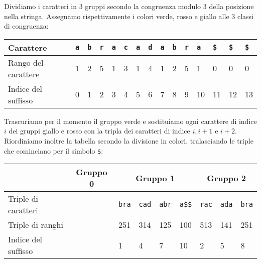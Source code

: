 Dividiamo i caratteri in \(3\) gruppi secondo la congruenza modulo \(3\) della 
posizione nella stringa. Assegnamo rispettivamente i colori verde, rosso e giallo 
alle \(3\) classi di congruenza:
\begin{table}[H]
  \begin{tabularx}{\linewidth}{l*{14}{X}}
    Carattere              & \texttt{a} & \texttt{b} & \texttt{r} & \texttt{a}
                           & \texttt{c} & \texttt{a} & \texttt{d} & \texttt{a}
                           & \texttt{b} & \texttt{r} & \texttt{a} & \texttt{\$}
                           & \texttt{\$} & \texttt{\$} \\
    \hline
    Rango del carattere    & 1 & 2 & 5 & 1 & 3 & 1 & 4 & 1 & 2 & 5 & 1 & 0 & 0 & 0 \\
    Indice del suffisso    & 0 \cellcolor{green} & 1 \cellcolor{red} & 2 \cellcolor{yellow} 
                           & 3 \cellcolor{green} & 4 \cellcolor{red} & 5 \cellcolor{yellow} 
                           & 6 \cellcolor{green} & 7 \cellcolor{red} & 8 \cellcolor{yellow} 
                           & 9 \cellcolor{green} & 10 \cellcolor{red} & 11 \cellcolor{yellow} 
                           & 12 \cellcolor{green} & 13 \cellcolor{red} \\
  \end{tabularx}
\end{table}

Trascuriamo per il momento il gruppo verde e sostituiamo ogni carattere di indice 
\(i\) dei gruppi giallo e rosso con la tripla dei caratteri di indice \(i, i+1\) 
e \(i+2\). Riordiniamo inoltre la tabella secondo la divisione in colori,
tralasciando le triple che cominciano per il simbolo \texttt{\$}:
\begin{table}[H]
  \begin{tabularx}{\linewidth}{l*{11}{X}}
                        & \multicolumn{4}{c}{Gruppo 0 \cellcolor{green} } 
                        & \multicolumn{4}{c}{Gruppo 1 \cellcolor{red} } 
                        & \multicolumn{3}{c}{Gruppo 2 \cellcolor{yellow} }\\
    \hline
    Triple di caratteri & \multicolumn{4}{c}{\cellcolor{gray!25}}
                        & \texttt{bra} & \texttt{cad} & \texttt{abr} & \texttt{a\$\$}
                        & \texttt{rac} & \texttt{ada} & \texttt{bra} \\
    Triple di ranghi    & \multicolumn{4}{c}{\cellcolor{gray!25}}
                        & 251 & 314 & 125 & 100
                        & 513 & 141 & 251 \\
    Indice del suffisso & \multicolumn{4}{c}{\cellcolor{gray!25}}
                        & 1 & 4 & 7 & 10
                        & 2 & 5 & 8 \\
  \end{tabularx}
\end{table}

